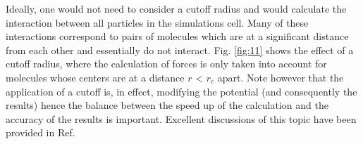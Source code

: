\documentclass[9pt,tutorial]{livecoms}
\begin{document}

Ideally, one would not need to consider a cutoff radius and would calculate the
interaction between all particles in the simulations cell. Many of these
interactions correspond to pairs of molecules which are at a significant
distance from each other and essentially do not interact. Fig. \ref{fig:11} shows the
effect of a cutoff radius, where the calculation of forces is only taken into
account for molecules whose centers are at a distance $r$ {\textless}
$r_{c}$ apart. Note however that the application of a cutoff is, in effect,
modifying the potential (and consequently the results) hence the balance
between the speed up of the calculation and the accuracy of the results is
important. Excellent discussions of this topic have been provided in Ref.
\citep{holcomb1993,trokhymchuk1999,mecke1997,duque2004,blas2008}
\end{document}
